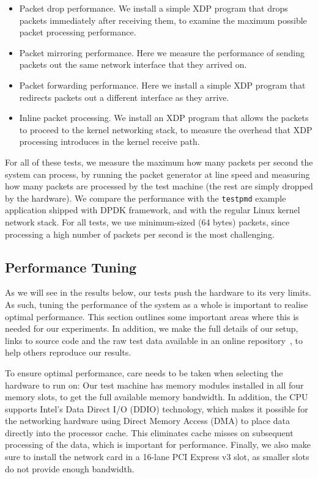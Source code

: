 \documentclass[10pt,sigconf]{acmart}
\begin{document}
\begin{itemize}
\item Packet drop performance. We install a simple XDP program that drops
  packets immediately after receiving them, to examine the maximum possible
  packet processing performance.

\item Packet mirroring performance. Here we measure the performance of sending
  packets out the same network interface that they arrived on.

\item Packet forwarding performance. Here we install a simple XDP program that
  redirects packets out a different interface as they arrive.

\item Inline packet processing. We install an XDP program that allows the
  packets to proceed to the kernel networking stack, to measure the overhead
  that XDP processing introduces in the kernel receive path.
\end{itemize}


For all of these tests, we measure the maximum how many packets per second the
system can process, by running the packet generator at line speed and measuring
how many packets are processed by the test machine (the rest are simply dropped
by the hardware). We compare the performance with the \texttt{testpmd} example
application shipped with DPDK framework, and with the regular Linux kernel
network stack. For all tests, we use minimum-sized (64 bytes) packets, since
processing a high number of packets per second is the most challenging.

\subsection{Performance Tuning}
\label{sec:performance-tuning}

As we will see in the results below, our tests push the hardware to its very
limits. As such, tuning the performance of the system as a whole is important to
realise optimal performance. This section outlines some important areas where
this is needed for our experiments. In addition, we make the full details of our
setup, links to source code and the raw test data available in an online
repository~\cite{test-data}, to help others reproduce our results.

To ensure optimal performance, care needs to be taken when selecting the
hardware to run on: Our test machine has memory modules installed in all four
memory slots, to get the full available memory bandwidth. In addition, the CPU
supports Intel's Data Direct I/O (DDIO) technology, which makes it possible for
the networking hardware using Direct Memory Access (DMA) to place data directly
into the processor cache. This eliminates cache misses on subsequent processing
of the data, which is important for performance. Finally, we also make sure to
install the network card in a 16-lane PCI Express v3 slot, as smaller slots do
not provide enough bandwidth.
\end{document}

